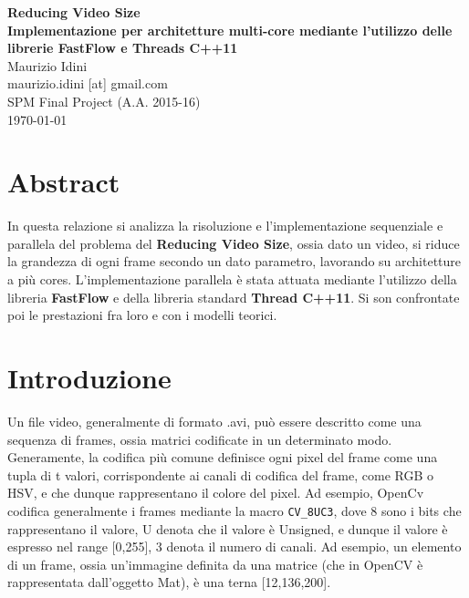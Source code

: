 \documentclass[12pt]{article}
\begin{document}
\renewcommand{\figurename}{Fig.}
\begin{center}
\LARGE\textbf{Reducing Video Size\\Implementazione per architetture multi-core mediante l'utilizzo delle librerie FastFlow e Threads C++11}\\
\vspace{0.2in}
\center
\normalsize{Maurizio Idini}\\
\normalsize{maurizio.idini [at] gmail.com}\\
\normalsize{SPM Final Project (A.A. 2015-16)} \\
\normalsize{\today}\\
\end{center}

\section*{Abstract}
In questa relazione si analizza la risoluzione e l'implementazione sequenziale e parallela del problema del \textbf{Reducing Video Size}, ossia dato un video, si riduce la grandezza di ogni frame secondo un dato parametro, lavorando su architetture a pi\`u cores. L'implementazione parallela \`e stata attuata mediante l'utilizzo della libreria \textbf{FastFlow} e della libreria standard \textbf{Thread C++11}. Si son confrontate poi le prestazioni fra loro e con i modelli teorici.

\section{Introduzione}
Un file video, generalmente di formato .avi, pu\`o essere descritto come una sequenza di frames, ossia matrici codificate in un determinato modo. Generamente, la codifica pi\`u comune definisce ogni pixel del frame come una tupla di t valori, corrispondente ai canali di codifica del frame, come RGB o HSV, e che dunque rappresentano il colore del pixel. Ad esempio, OpenCv codifica generalmente i frames mediante la macro \texttt{CV\_8UC3}, dove 8 sono i bits che rappresentano il valore, U denota che il valore \`e Unsigned, e dunque il valore \`e espresso nel range [0,255], 3 denota il numero di canali. Ad esempio, un elemento di un frame, ossia un'immagine definita da una matrice (che in OpenCV \`e rappresentata dall'oggetto Mat),  \`e una terna [12,136,200].
\end{document}
